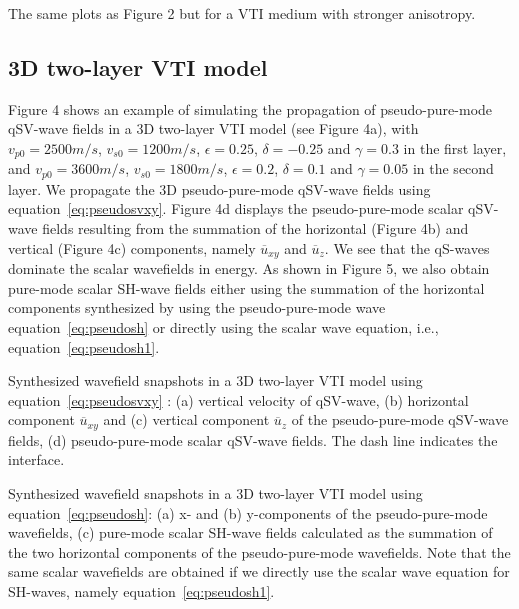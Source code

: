   {
  The same plots as Figure 2 but for a VTI medium with stronger anisotropy.
   }

\subsection{3D two-layer VTI model}


Figure 4 shows an example of simulating the propagation of pseudo-pure-mode qSV-wave fields in a 3D two-layer
 VTI  model (see Figure 4a), with
$v_{p0}=2500 m/s$, $v_{s0}=1200 m/s$, $\epsilon=0.25$, $\delta=-0.25$ and $\gamma=0.3$ in the first layer, and
$v_{p0}=3600 m/s$, $v_{s0}=1800 m/s$, $\epsilon=0.2$, $\delta=0.1$ and $\gamma=0.05$ in the second layer.
We propagate the 3D pseudo-pure-mode qSV-wave fields using equation~\ref{eq:pseudosvxy}.
Figure 4d displays the pseudo-pure-mode scalar qSV-wave fields resulting from the summation of 
the horizontal (Figure 4b) and vertical (Figure 4c) components, namely $\overline{u}_{xy}$ and $\overline{u}_z$.
We see that the qS-waves dominate the scalar wavefields in energy. 
As shown in Figure 5, we also obtain pure-mode scalar SH-wave fields either using the summation of the horizontal components
synthesized by using the pseudo-pure-mode wave equation~\ref{eq:pseudosh} or directly using the scalar wave equation, i.e., equation~\ref{eq:pseudosh1}. 

{
Synthesized wavefield snapshots in a 3D two-layer VTI model using equation~\ref{eq:pseudosvxy} : (a) vertical velocity of qSV-wave,
(b) horizontal component $\overline{u}_{xy}$ and (c) vertical component $\overline{u}_z$ of the pseudo-pure-mode qSV-wave fields,
(d) pseudo-pure-mode scalar qSV-wave fields. The dash line indicates the interface.
}

{
Synthesized wavefield snapshots in a 3D two-layer VTI model using equation~\ref{eq:pseudosh}: (a) x- and (b) y-components
of the pseudo-pure-mode wavefields, (c) pure-mode scalar SH-wave fields calculated as the summation of the two horizontal 
components of the pseudo-pure-mode wavefields. Note that the same scalar wavefields are obtained if we directly
use the scalar wave equation for SH-waves, namely equation~\ref{eq:pseudosh1}.
}

